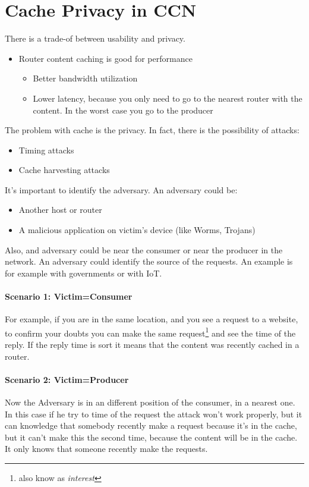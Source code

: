 \section{Cache Privacy in CCN}

There is a trade-of between usability and privacy.
\begin{itemize}
  \item Router content caching is good for performance
  \begin{itemize}
    \item Better bandwidth utilization
    \item Lower latency, because you only need to go to the nearest router with
the content. In the worst case you go to the producer
  \end{itemize}
\end{itemize}

The problem with cache is the privacy. In fact, there is the possibility of
attacks:
\begin{itemize}
  \item Timing attacks
  \item Cache harvesting attacks
\end{itemize}

It's important to identify the adversary. An adversary could be:
\begin{itemize}
  \item Another host or router
  \item A malicious application on victim's device (like Worms, Trojans)
\end{itemize}

Also, and adversary could be near the consumer or near the producer in the
network. An adversary could identify the source of the requests. An example is
for example with governments or with IoT.

\paragraph{Scenario 1: Victim=Consumer}
For example, if you are in the same location, and you see a request to a
website, to confirm your doubts you can make the same request\footnote{also
know as \textit{interest}} and see the time of the reply. If the reply time is
sort it means that the content was recently cached in a router.

\paragraph{Scenario 2: Victim=Producer}
Now the Adversary is in an different position of the consumer, in a nearest one.
In this case if he try to time of the request the attack won't work properly,
but it can knowledge that somebody recently make a request because it's in the
cache, but it can't make this the second time, because the content will be in
the cache. It only knows that someone recently make the requests.

